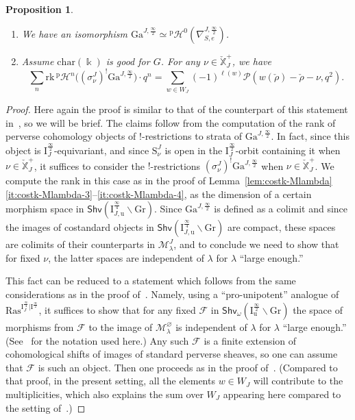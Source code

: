 \documentclass[11pt]{amsart}
\numberwithin{equation}{section}
\theoremstyle{plain}
\newtheorem{prop}[thm]{Proposition}
\theoremstyle{definition}
\newcommand{\sF}{{\mathcal F}}
\newcommand{\sH}{{\mathcal H}}
\newcommand{\I}{{\mathrm I}}
\renewcommand{\k}{\Bbbk}
\newcommand{\sM}{{\mathcal M}}
\newcommand{\sP}{{\mathcal P}}
\newcommand{\X}{{\mathbb X}}
\newcommand{\Xd}{\check{\X}}
\newcommand{\cha}{{\mathrm{char}}}
\newcommand{\rk}{\mathrm{rk}}
\newcommand{\semi}{{{\frac{\infty}{2}}}}
\newcommand{\quar}{{{\frac{\infty}{4}}}}
\newcommand{\ex}{\mathrm{ext}}
\newcommand{\Shv}{\mathsf{Shv}}
\newcommand{\Ras}{\mathrm{Ras}}
\newcommand{\Gr}{\mathrm{Gr}}
\newcommand{\Gait}{\mathrm{Ga}}
\begin{document}
\begin{prop}
\label{prop:costk-Ga}
\begin{enumerate}
\item
\label{it:costk-Ga-1} 
We have an isomorphism $\Gait^{J,\semi} \simeq {}^{\mathrm{p}}\sH^0(\nabla^{J,\semi}_{S,e})$. 
\item
\label{it:costk-Ga-2} 
Assume $\cha(\k)$ is good for $G$. 
For any $\nu\in \Xd^+_J$, we have 
\begin{equation*}
\sum_{n} \rk\, {}^{\mathrm{p}}\sH^n\big( (\sigma^J_\nu)^!\Gait^{J,\semi} \big) \cdot q^n 
= \sum_{w\in W_J} (-1)^{\ell(w)} \sP(w({\check \rho})-{\check \rho} -\nu, q^2). 
\end{equation*}
\end{enumerate}
\end{prop}

\begin{proof}
Here again the proof is similar to that of the counterpart of this statement in~\cite[\S 8.2]{adr}, so we will be brief. 
The claims follow from the computation of the rank of perverse cohomology objects of $!$-restrictions to strata of $\Gait^{J,\semi}$. In fact, since this object is $\I_J^\semi$-equivariant, and since $\mathrm{S}^J_\nu$ is open in the $\I_J^\semi$-orbit containing it when $\nu \in \Xd^+_J$, it suffices to consider the $!$-restrictions $(\sigma^J_\nu)^!\Gait^{J,\semi}$ when $\nu \in \Xd^+_J$. We compute the rank in this case 
as in the proof of Lemma~\ref{lem:costk-Mlambda}\eqref{it:costk-Mlambda-3}--\eqref{it:costk-Mlambda-4}, as the dimension of a certain morphism space in $\Shv(\I_{J,\mathrm{u}}^\quar \backslash \Gr)$. Since $\Gait^{J,\semi}$ is defined as a colimit and since the images of costandard objects in $\Shv(\I_{J,\mathrm{u}}^\quar \backslash \Gr)$ are compact, these spaces are colimits of their counterparts in $\sM_\lambda^J$, and to conclude we need to show that for fixed $\nu$, the latter spaces are independent of $\lambda$ for $\lambda$ ``large enough.'' 

This fact can be reduced to a statement which follows from the same considerations as in the proof of~\cite[Theorem~8.2]{adr}. Namely, using a ``pro-unipotent'' analogue of $\Ras^{\I_J^\quar | \I^\semi}$, it suffices to show that for any fixed $\sF$ in $\Shv_\omega(\I_{\mathrm{u}}^\semi \backslash \Gr)$ the space of morphisms from $\sF$ to the image of $\sM_\lambda^\varnothing$ is independent of $\lambda$ for $\lambda$ ``large enough.'' (See~\cite[\S 6.4]{adr} for the notation used here.) Any such $\sF$ is a finite extension of cohomological shifts of images of standard perverse sheaves, so one can assume that $\sF$ is such an object. Then one proceeds as in the proof of~\cite[Theorem~8.2]{adr}.
(Compared to that proof, in the present setting, all the elements $w \in W_J$ will contribute to the multiplicities, which also explains the sum over $W_J$ appearing here compared to the setting of~\cite{adr}.)
\end{proof}
\end{document}
